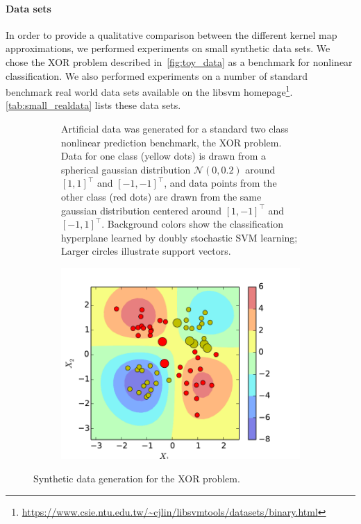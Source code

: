 \documentclass{article} %
\begin{document}
\paragraph{Data sets}
In order to provide a qualitative comparison between the different kernel map approximations, we performed experiments on small synthetic data sets. We chose the XOR problem described in~\autoref{fig:toy_data} as a benchmark for nonlinear classification. We also performed experiments on a number of standard benchmark real world data sets available on the libsvm homepage\footnote{\url{https://www.csie.ntu.edu.tw/~cjlin/libsvmtools/datasets/binary.html}}. \autoref{tab:small_realdata} lists these data sets. 
%
\begin{figure}[!ht]
    \centering
           \hfill
        \begin{subfigure}[b]{0.5\textwidth}
         Artificial data was generated for a standard two class nonlinear prediction benchmark, the XOR problem.
        Data for one class (yellow dots) is drawn from a spherical gaussian distribution $\mathcal{N}(0,0.2)$ around $[1,1]^\top$ and $[-1,-1]^\top$, and data points from the other class (red dots) are drawn from the same gaussian distribution centered around $[1,-1]^\top$ and $[-1,1]^\top$. 
         Background colors show the classification hyperplane learned by doubly stochastic SVM learning; Larger circles illustrate support vectors.\\     
        \end{subfigure}
	\hfill
         \begin{subfigure}[b]{0.4\textwidth}
         \centering
        \includegraphics[width=1\columnwidth]{imgs/svm_kernel}
               \label{fig:toy_data}
        \end{subfigure}

        \caption{\label{fig:toy_data} Synthetic data generation for the XOR problem.}
\end{figure}
\end{document}
